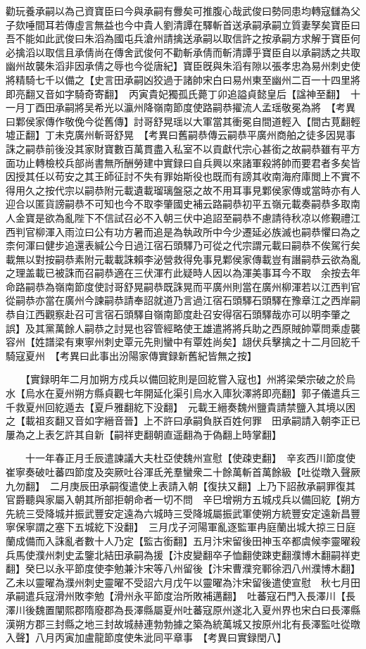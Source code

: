 勸玩養承嗣以為己資寶臣曰今與承嗣有釁矣可推腹心哉武俊曰勢同患均轉寇讎為父子欬唾間耳若傳虛言無益也今中貴人劉清譚在驛斬首送承嗣承嗣立質妻孥矣寶臣曰吾不能如此武俊曰朱滔為國屯兵滄州請擒送承嗣以取信許之按承嗣方求解于寶臣何必擒滔以取信且承倩尚在傳舍武俊何不勸斬承倩而斬清譚乎寶臣自以承嗣誘之共取幽州故襲朱滔非因承倩之辱也今從唐紀】寶臣旣與朱滔有隙以張孝忠為易州刺史使將精騎七千以備之【史言田承嗣凶狡過于諸帥宋白曰易州東至幽州二百一十四里將即亮翻又音如字騎奇寄翻】　丙寅貴妃獨孤氏薨丁卯追謚貞懿皇后【諡神至翻】　十一月丁酉田承嗣將吴希光以瀛州降嶺南節度使路嗣恭擢流人孟瑶敬冕為將　【考異曰鄴侯家傳作敬俛今從舊傳】討哥舒晃瑶以大軍當其衝冕自間道輕入【間古莧翻輕墟正翻】丁未克廣州斬哥舒晃　【考異曰舊嗣恭傳云嗣恭平廣州商舶之徒多因晃事誅之嗣恭前後没其家財寶數百萬貫盡入私室不以貢獻代宗心甚銜之故嗣恭雖有平方面功止轉檢校兵部尚書無所酬勞建中實録曰自兵興以來諸軍殺將帥而要君者多矣皆因授其任以苟安之其王師征討不失有罪始斯役也既而有謗其收南海府庫閲上不實不得用久之按代宗以嗣恭附元載遺載瑠璃盤惡之故不用耳事見鄴侯家傳或當時亦有人迎合以匿貨謗嗣恭不可知也今不取李肇國史補云路嗣恭初平五嶺元載奏嗣恭多取南人金寶是欲為亂陛下不信試召必不入朝三伏中追詔至嗣恭不慮請待秋凉以修覲禮江西判官柳渾入雨泣曰公有功方暑而追是為執政所中今少遷延必族滅也嗣恭懼曰為之柰何渾曰健步追還表緘公今日過江宿石頭驛乃可從之代宗謂元載曰嗣恭不俟駕行矣載無以對按嗣恭素附元載載誅賴李泌營救得免事見鄴侯家傳載豈有譖嗣恭云欲為亂之理盖載已被誅而召嗣恭適在三伏渾冇此疑時人因以為渾美事耳今不取　余按去年命路嗣恭為嶺南節度使討哥舒晃嗣恭既誅晃而平廣州則當在廣州柳渾若以江西判官從嗣恭亦當在廣州今諫嗣恭請奉詔就道乃言過江宿石頭驛石頭驛在豫章江之西岸嗣恭自江西觀察赴召可言宿石頭驛自嶺南節度赴召安得宿石頭驛哉亦可以明李肇之誤】及其黨萬餘人嗣恭之討晃也容管經略使王雄遣將將兵助之西原賊帥覃問乘虛襲容州【姓譜梁有東寧州刺史覃元先則蠻中有覃姓尚矣】翃伏兵擊擒之十二月回紇千騎寇夏州　【考異曰此事出汾陽家傳實録新舊紀皆無之按】

　　【實録明年二月加朔方戍兵以備回紇則是回紇嘗入寇也】州將梁榮宗破之於烏水【烏水在夏州朔方縣貞觀七年開延化渠引烏水入庫狄澤將即亮翻】郭子儀遣兵三千救夏州回紇遁去【夏戶雅翻紇下没翻】　元載王縉奏魏州鹽貴請禁鹽入其境以困之【載祖亥翻又音如字縉音晉】上不許曰承嗣負朕百姓何罪　田承嗣請入朝李正已屢為之上表乞許其自新【嗣祥吏翻朝直遥翻為于偽翻上時掌翻】

　　十一年春正月壬辰遣諫議大夫杜亞使魏州宣慰【使疎吏翻】　辛亥西川節度使崔寧奏破吐蕃四節度及突厥吐谷渾氐羌羣蠻衆二十餘萬斬首萬餘級【吐從暾入聲厥九勿翻】　二月庚辰田承嗣復遣使上表請入朝【復扶又翻】上乃下詔赦承嗣罪復其官爵聽與家屬入朝其所部拒朝命者一切不問　辛巳增朔方五城戍兵以備回紇【朔方先統三受降城并振武豐安定遠為六城時三受降城屬振武軍使朔方統豐安定遠新昌豐寧保寧謂之塞下五城紇下没翻】　三月戊子河陽軍亂逐監軍冉庭蘭出城大掠三日庭蘭成備而入誅亂者數十人乃定【監古銜翻】五月汴宋留後田神玉卒都虞候李靈曜殺兵馬使濮州刺史孟鑒北結田承嗣為援【汴皮變翻卒子恤翻使踈吏翻濮博木翻嗣祥吏翻】癸巳以永平節度使李勉兼汴宋等八州留後【汴宋曹濮兖鄆徐泗八州濮博木翻】乙未以靈曜為濮州刺史靈曜不受詔六月戊午以靈曜為汴宋留後遣使宣慰　秋七月田承嗣遣兵寇滑州敗李勉【滑州永平節度治所敗補邁翻】　吐蕃寇石門入長澤川【長澤川後魏置闡熙郡隋廢郡為長澤縣屬夏州吐蕃寇原州遂北入夏州界也宋白曰長澤縣漢朔方郡三封縣之地三封故城赫連勃勃據之築為統萬城又按原州北有長澤監吐從暾入聲】八月丙寅加盧龍節度使朱泚同平章事　【考異曰實録閏八】

